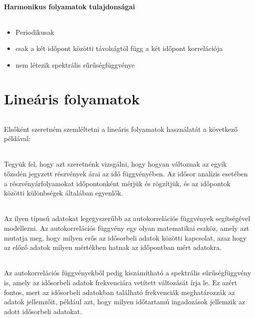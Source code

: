\documentclass[11pt,a4paper]{article}
\begin{document}
			\subsection{Harmonikus folyamatok tulajdonságai}
				\paragraph{}
					\begin{itemize}
						\item Periodikusak
						\item csak a két időpont közötti távolságtól függ a két időpont korrelációja
						\item nem létezik spektrális sűrűségfüggvénye
					\end{itemize}
		\part{Lineáris folyamatok}
			\paragraph{}
				Elsőként szeretném szemléltetni a lineáris folyamatok használatát a következő példával:
			\paragraph{}
				Tegyük fel, hogy azt szeretnénk vizsgálni, hogy hogyan változnak az egyik tőzsdén jegyzett részvények árai az idő függvényében. Az idősor analízis esetében a részvényárfolyamokat időpontonként mérjük és rögzítjük, és az időpontok közötti különbségek általában egyenlők.
			\paragraph{}
				Az ilyen típusú adatokat legegyszerűbb az autokorrelációs függvények segítségével modellezni. Az autokorrelációs függvény egy olyan matematikai eszköz, amely azt mutatja meg, hogy milyen erős az idősorbeli adatok közötti kapcsolat, azaz hogy az előző adatok milyen mértékben hatnak az időpontban mért adatokra.
			\paragraph{}
				Az autokorrelációs függvényekből pedig kiszámítható a spektrális sűrűségfüggvény is, amely az idősorbeli adatok frekvenciára vetített változását írja le. Ez azért fontos, mert az idősorbeli adatokban található frekvenciák meghatározzák az adatok jellemzőit, például azt, hogy milyen időtartamú ingadozások jellemzik az adott idősorbeli adatokat.
\end{document}
